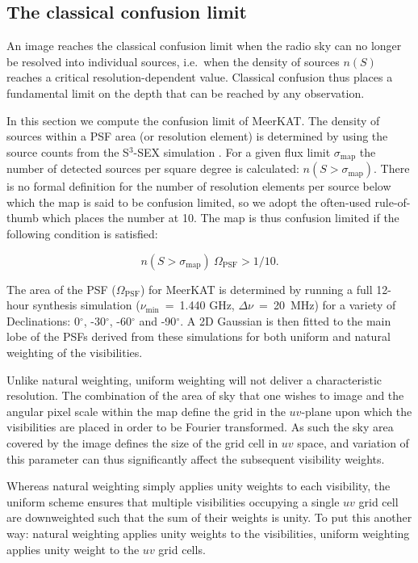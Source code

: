 \documentclass{aa}
\begin{document}
\subsection{The classical confusion limit}

An image reaches the classical confusion limit when the radio sky can no longer be resolved into individual sources, i.e.~when the density of sources $n(S)$ reaches a critical resolution-dependent value. Classical confusion thus places a fundamental limit on the depth that can be reached by any observation.

In this section we compute the confusion limit of MeerKAT. The density of sources within a PSF area (or resolution element) is determined by using the source counts from the S$^{3}$-SEX simulation \citep{Wilman-simulation}. For a given flux limit $\sigma_\mathrm{map}$ the number of detected sources per square degree is calculated: $n(S > \sigma_\mathrm{map})$. There is no formal definition for the number of resolution elements per source below which the map is said to be confusion limited, so we adopt the often-used rule-of-thumb which places the number at 10. The map is thus confusion limited if the following condition is satisfied:

\begin{equation}
n(S > \sigma_\mathrm{map})~\Omega_\mathrm{PSF} > 1 / 10.
\label{eq:conf_limit}
\end{equation}

The area of the PSF ($\Omega_\mathrm{PSF}$) for MeerKAT is determined by running a full 12-hour synthesis simulation ($\nu_\mathrm{min}$~=~1.440 GHz, $\Delta \nu$~=~20~MHz) for a variety of Declinations: 0$^{\circ}$, -30$^{\circ}$, -60$^{\circ}$ and -90$^{\circ}$. A 2D Gaussian is then fitted to the main lobe of the PSFs derived from these simulations for both uniform and natural weighting of the visibilities.

Unlike natural weighting, uniform weighting will not deliver a characteristic resolution. The combination of the area of sky that one wishes to image and the angular pixel scale within the map define the grid in the $uv$-plane upon which the visibilities are placed in order to be Fourier transformed. As such the sky area covered by the image defines the size of the grid cell in $uv$ space, and variation of this parameter can thus significantly affect the subsequent visibility weights.

Whereas natural weighting simply applies unity weights to each visibility, the uniform scheme ensures that multiple visibilities occupying a single $uv$ grid cell are downweighted such that the sum of their weights is unity. To put this another way: natural weighting applies unity weights to the visibilities, uniform weighting applies unity weight to the $uv$ grid cells.
\end{document}

